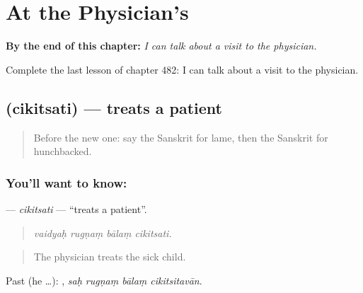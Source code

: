 
\chapter{At the Physician's}
\label{ch:sa-at-the-physician-s}

\begin{chapteropening}
\textbf{By the end of this chapter:} \emph{I can talk about a visit to the physician.}

Complete the last lesson of chapter 482: I can talk about a visit to the physician.
\end{chapteropening}

\section[\texorpdfstring{\sk{चिकित्सति} (cikitsati)}{चिकित्सति (cikitsati)}]{ (cikitsati) — treats a patient}

\label{lesson:SA-C482-cikitsati}



\begin{quote}
Before the new one: say the Sanskrit for lame, then the Sanskrit for hunchbacked.
\end{quote}

\subsection*{You'll want to know: }
\textbf{} — \emph{cikitsati} — \textquotedblleft{}treats a patient\textquotedblright{}.

\begin{quote}
   
\end{quote}

\begin{quote}
\emph{vaidyaḥ rugṇaṃ bālaṃ cikitsati.}
\end{quote}

\begin{quote}
The physician treats the sick child.
\end{quote}

Past (he …):    , \emph{saḥ rugṇaṃ bālaṃ cikitsitavān}.

